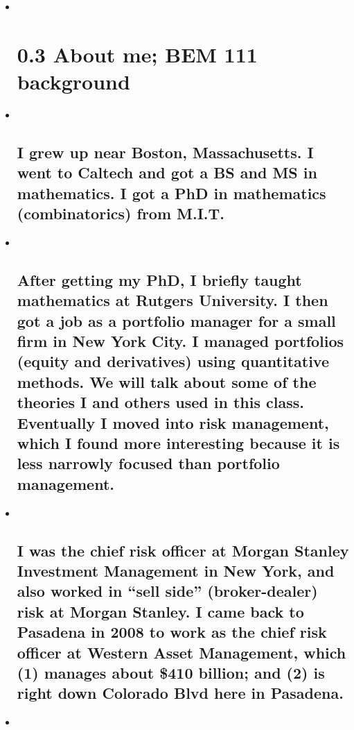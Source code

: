 \documentclass[11pt]{article}
\begin{document}
    \begin{itemize}
\item ~
  \section{0.3 About me; BEM 111
  background}\label{about-me-bem-111-background}
\item ~
  \subsection{I grew up near Boston, Massachusetts. I went to Caltech
  and got a BS and MS in mathematics. I got a PhD in mathematics
  (combinatorics) from
  M.I.T.}\label{i-grew-up-near-boston-massachusetts.-i-went-to-caltech-and-got-a-bs-and-ms-in-mathematics.-i-got-a-phd-in-mathematics-combinatorics-from-m.i.t.}
\item ~
  \subsection{After getting my PhD, I briefly taught mathematics at
  Rutgers University. I then got a job as a portfolio manager for a
  small firm in New York City. I managed portfolios (equity and
  derivatives) using quantitative methods. We will talk about some of
  the theories I and others used in this class. Eventually I moved into
  risk management, which I found more interesting because it is less
  narrowly focused than portfolio
  management.}\label{after-getting-my-phd-i-briefly-taught-mathematics-at-rutgers-university.-i-then-got-a-job-as-a-portfolio-manager-for-a-small-firm-in-new-york-city.-i-managed-portfolios-equity-and-derivatives-using-quantitative-methods.-we-will-talk-about-some-of-the-theories-i-and-others-used-in-this-class.-eventually-i-moved-into-risk-management-which-i-found-more-interesting-because-it-is-less-narrowly-focused-than-portfolio-management.}
\item ~
  \subsection{I was the chief risk officer at Morgan Stanley Investment
  Management in New York, and also worked in ``sell side''
  (broker-dealer) risk at Morgan Stanley. I came back to Pasadena in
  2008 to work as the chief risk officer at Western Asset Management,
  which (1) manages about \$410 billion; and (2) is right down Colorado
  Blvd here in
  Pasadena.}\label{i-was-the-chief-risk-officer-at-morgan-stanley-investment-management-in-new-york-and-also-worked-in-sell-side-broker-dealer-risk-at-morgan-stanley.-i-came-back-to-pasadena-in-2008-to-work-as-the-chief-risk-officer-at-western-asset-management-which-1-manages-about-410-billion-and-2-is-right-down-colorado-blvd-here-in-pasadena.}
\item ~

\end{itemize}
\end{document}
